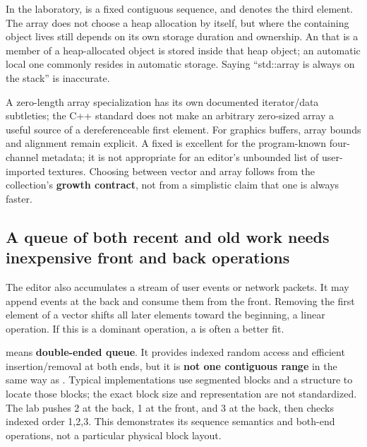 In the laboratory,  is a fixed contiguous sequence, and  denotes the third element. The array does not choose a heap allocation by itself, but where the containing object lives still depends on its own storage duration and ownership. An  that is a member of a heap-allocated object is stored inside that heap object; an automatic local one commonly resides in automatic storage. Saying ``std::array is always on the stack'' is inaccurate.

A zero-length array specialization has its own documented iterator/data subtleties; the C++ standard does not make an arbitrary zero-sized array a useful source of a dereferenceable first element. For graphics buffers, array bounds and alignment remain explicit. A fixed  is excellent for the program-known four-channel metadata; it is not appropriate for an editor's unbounded list of user-imported textures. Choosing between vector and array follows from the collection's \textbf{growth contract}, not from a simplistic claim that one is always faster.

\subsection{A queue of both recent and old work needs inexpensive front and back operations}\label{05-engine-i-ch005-a-queue-of-both-recent-and-old-work-needs-inexpensive-front-and-back-operations}

\hypertarget{05-engine-i-ch005-a-queue-of-both-recent-and-old-work-needs-inexpensive-front-and-back-operations}{}

The editor also accumulates a stream of user events or network packets. It may append events at the back and consume them from the front. Removing the first element of a vector shifts all later elements toward the beginning, a linear operation. If this is a dominant operation, a  is often a better fit.

 means \textbf{double-ended queue}. It provides indexed random access and efficient insertion/removal at both ends, but it is \textbf{not one contiguous  range} in the same way as . Typical implementations use segmented blocks and a structure to locate those blocks; the exact block size and representation are not standardized. The lab pushes 2 at the back, 1 at the front, and 3 at the back, then checks indexed order 1,2,3. This demonstrates its sequence semantics and both-end operations, not a particular physical block layout.

